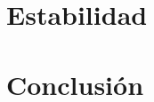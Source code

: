 \documentclass{article}
\theoremstyle{theorem-style}  %
\theoremstyle{definition}
\theoremstyle{example-style}
\begin{document}

\section{Estabilidad}


\section{Conclusión}



\printbibliography
\end{document}
